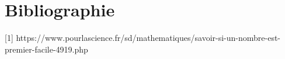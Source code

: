 \chapter{Bibliographie}
[1] https://www.pourlascience.fr/sd/mathematiques/savoir-si-un-nombre-est-premier-facile-4919.php